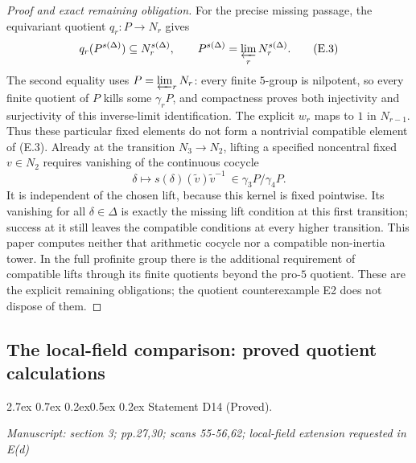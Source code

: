 \documentclass[11pt,a4paper]{article}
\makeatletter
\newcommand{\passage}[1]{\par\smallskip\noindent\textit{Manuscript: #1}\par\smallskip}
\renewcommand\paragraph{\@startsection{paragraph}{4}{\z@}%
  {2.7ex \@plus 0.7ex \@minus 0.2ex}{0.5ex \@plus 0.2ex}%
  {\normalfont\normalsize\bfseries}}
\makeatother
\begin{document}
\begin{proof}[Proof and exact remaining obligation]
For the precise missing passage, the equivariant quotient $q_r:P\to N_r$ gives
\[
 q_r(P^{s(\Delta)})\subseteq N_r^{s(\Delta)},\qquad
 P^{s(\Delta)}=\varprojlim_r N_r^{s(\Delta)}.
 \tag{E.3}
\]
The second equality uses $P=\varprojlim_rN_r$: every finite $5$-group is nilpotent, so every finite quotient of $P$ kills some $\gamma_rP$, and compactness proves both injectivity and surjectivity of this inverse-limit identification. The explicit $w_r$ maps to $1$ in $N_{r-1}$. Thus these particular fixed elements do not form a nontrivial compatible element of (E.3). Already at the transition $N_3\to N_2$, lifting a specified noncentral fixed $v\in N_2$ requires vanishing of the continuous cocycle
\[
 \delta\longmapsto s(\delta)(\widetilde v)\widetilde v^{-1}
 \ \in\gamma_3P/\gamma_4P.
\]
It is independent of the chosen lift, because this kernel is fixed pointwise. Its vanishing for all $\delta\in\Delta$ is exactly the missing lift condition at this first transition; success at it still leaves the compatible conditions at every higher transition. This paper computes neither that arithmetic cocycle nor a compatible non-inertia tower. In the full profinite group there is the additional requirement of compatible lifts through its finite quotients beyond the pro-$5$ quotient. These are the explicit remaining obligations; the quotient counterexample E2 does not dispose of them.
\end{proof}



\subsection{The local-field comparison: proved quotient calculations}

\paragraph{Statement D14 (Proved).}\label{res:D14}
\passage{section 3; pp.27,30; scans 55-56,62; local-field extension requested in E(d)}
\end{document}

